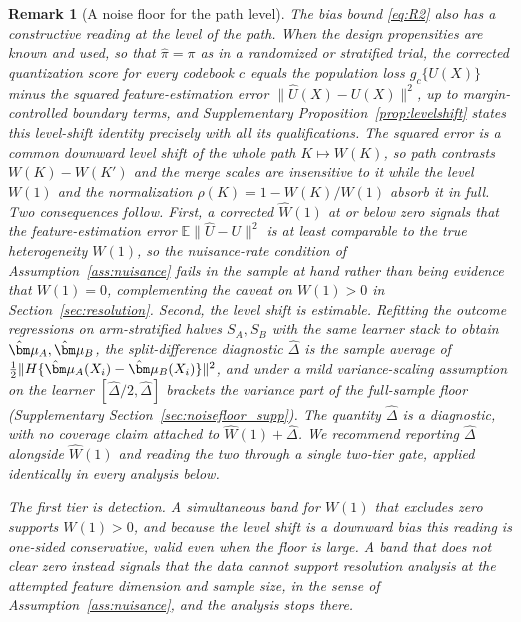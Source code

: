 \documentclass[11pt]{article}
\newtheorem{remark}{Remark}
\newcommand{\E}{\mathbb E}
\newcommand{\bmu}{\bm\mu}
\newcommand{\hU}{\widehat U}
\begin{document}
\begin{remark}[A noise floor for the path level]\label{rem:noisefloor}
The bias bound \eqref{eq:R2} also has a constructive reading at the level of the path. When the design propensities are known and used, so that $\hat\pi=\pi$ as in a randomized or stratified trial, the corrected quantization score for every codebook $c$ equals the population loss $g_c\{U(X)\}$ minus the squared feature-estimation error $\|\hU(X)-U(X)\|^2$, up to margin-controlled boundary terms, and Supplementary Proposition~\ref{prop:levelshift} states this level-shift identity precisely with all its qualifications. The squared error is a common downward level shift of the whole path $K\mapsto W(K)$, so path contrasts $W(K)-W(K')$ and the merge scales are insensitive to it while the level $W(1)$ and the normalization $\rho(K)=1-W(K)/W(1)$ absorb it in full. Two consequences follow. First, a corrected $\widehat W(1)$ at or below zero signals that the feature-estimation error $\E\|\hU-U\|^2$ is at least comparable to the true heterogeneity $W(1)$, so the nuisance-rate condition of Assumption~\ref{ass:nuisance} fails in the sample at hand rather than being evidence that $W(1)=0$, complementing the caveat on $W(1)>0$ in Section~\ref{sec:resolution}. Second, the level shift is estimable. Refitting the outcome regressions on arm-stratified halves $S_A,S_B$ with the same learner stack to obtain $\hat\bmu_A,\hat\bmu_B$, the split-difference diagnostic $\widehat\Delta$ is the sample average of $\tfrac12\|H\{\hat\bmu_A(X_i)-\hat\bmu_B(X_i)\}\|^2$, and under a mild variance-scaling assumption on the learner $[\widehat\Delta/2,\widehat\Delta]$ brackets the variance part of the full-sample floor (Supplementary Section~\ref{sec:noisefloor_supp}). The quantity $\widehat\Delta$ is a diagnostic, with no coverage claim attached to $\widehat W(1)+\widehat\Delta$. We recommend reporting $\widehat\Delta$ alongside $\widehat W(1)$ and reading the two through a single two-tier gate, applied identically in every analysis below.

The first tier is detection. A simultaneous band for $W(1)$ that excludes zero supports $W(1)>0$, and because the level shift is a downward bias this reading is one-sided conservative, valid even when the floor is large. A band that does not clear zero instead signals that the data cannot support resolution analysis at the attempted feature dimension and sample size, in the sense of Assumption~\ref{ass:nuisance}, and the analysis stops there.


\end{remark}
\end{document}
